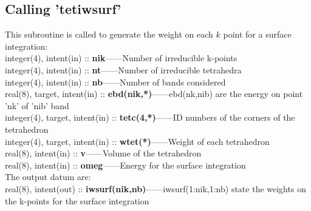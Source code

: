 \documentclass[10pt]{article}
\begin{document}
\subsection{Calling 'tetiwsurf'}


This subroutine is called to generate the weight on each $k$ point for a surface integration:\\

integer(4), intent(in) :: \textbf{nik}------Number of irreducible k-points\\
      
integer(4), intent(in) :: \textbf{nt}------Number of irreducible tetrahedra\\

integer(4), intent(in) :: \textbf{nb}------Number of bands considered\\

real(8), target, intent(in) :: \textbf{ebd(nik,*)}------ebd(nk,nib) are the energy on point 'nk' of 'nib' band\\

integer(4), target, intent(in) :: \textbf{tetc(4,*)}------ID numbers of the corners of the tetrahedron\\

integer(4), target, intent(in) :: \textbf{wtet(*)}------Weight of each tetrahedron\\

real(8), intent(in) :: \textbf{v}------Volume of the tetrahedron\\

real(8), intent(in) :: \textbf{omeg}------Energy for the surface integration\\

The output datum are:\\

real(8), intent(out) :: \textbf{iwsurf(nik,nb)}------iwsurf(1:nik,1:nb) state the weights on the k-points for the surface integration\\
\end{document}
